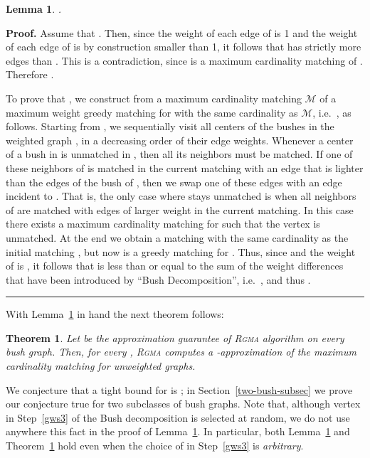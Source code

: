 \documentclass[a4paper,11pt]{article}
\newtheorem{theorem}{Theorem}
\newtheorem{lemma}{Lemma}
\newenvironment{proof}[1][Proof]{\noindent\textbf{#1.} }{\ \rule{0.5em}{0.5em}}
\newcommand{\mcal}{\ensuremath{\mathcal{M}}\xspace}
\newcommand{\rgma}{\textsc{Rgma}\xspace}
\begin{document}
\begin{lemma}
\label{lem:cardopt}
.
\end{lemma}
\begin{proof}
Assume that . Then, since the weight of each edge of  is 1 and the weight of each 
edge of  is by construction smaller than 1, it follows that  has strictly more edges than 
. This is a contradiction, since  is a maximum cardinality matching of . 
Therefore .


To prove that , we construct 
from a maximum cardinality matching \mcal of  
a maximum weight greedy matching  for  with the same cardinality as \mcal, 
i.e.~, as follows. 
Starting from , we sequentially visit all centers  
of the bushes in the weighted graph , in a decreasing order of their edge weights.
Whenever a center  of a bush in  is unmatched in , 
then all its neighbors must be matched. If one of these neighbors of  
is matched in the current matching with an edge that is lighter than the edges of the bush of , 
then we swap one of these edges with an edge incident to . 
That is, the only case where  stays unmatched is when all neighbors of  are matched 
with edges of larger weight in the current matching. In this case there exists a maximum
cardinality matching for  such that the vertex  is unmatched.
At the end we obtain a matching  with the same cardinality
as the initial matching , but now  is a greedy matching for 
. Thus, since  and the weight of  is 
, it follows that 
is less than or equal to the sum of the weight differences that have been 
introduced by ``Bush Decomposition'', i.e.~,
and thus .
\end{proof}



\medskip

With Lemma~\ref{lem:cardopt} in hand the next theorem follows:
\begin{theorem}
\label{thm:cardappx}
Let  be the approximation guarantee of \rgma algorithm on every bush graph. 
Then, for every , \rgma computes a -approximation of the 
maximum cardinality matching for unweighted graphs. 
\end{theorem}
We conjecture that a tight bound for  is ; in Section~\ref{two-bush-subsec} we prove our conjecture true for two subclasses of bush graphs. 
Note that, although vertex  in Step~\ref{gws3} of the Bush decomposition is selected at random, 
we do not use anywhere this fact in the proof of Lemma~\ref{lem:cardopt}. 
In particular, both Lemma~\ref{lem:cardopt} and Theorem~\ref{thm:cardappx} hold even when the choice of  in Step~\ref{gws3} is \emph{arbitrary}. 
\end{document}
